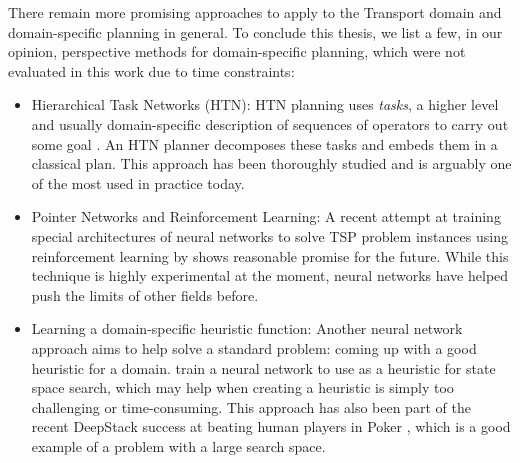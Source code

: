 There remain more promising approaches to apply to the Transport domain
and domain-specific planning in general.
To conclude this thesis, we list a few, in our opinion, perspective methods for domain-specific planning, which were not
evaluated in this work due to time constraints:
\begin{itemize}
\item Hierarchical Task Networks (HTN): 
HTN planning uses \textit{tasks},
a higher level and usually domain-specific description of sequences of operators
to carry out some goal
 \citep[Chapter~11]{Ghallab2004}. An HTN planner decomposes these tasks and embeds them in a classical plan. This approach has been thoroughly studied and is arguably one of the most used in practice today.

\item Pointer Networks and Reinforcement Learning: 
A recent attempt at training special architectures of neural networks to solve TSP problem instances using reinforcement learning by \citet{Bello2016} shows
reasonable promise for the future. While this technique is highly experimental at the moment,
neural networks have helped push the limits of other fields before.

\item Learning a domain-specific heuristic function: Another neural network
approach aims to help solve a standard problem: coming up with a good heuristic for a domain. \citet{Chen2011}
train a neural network to use as a heuristic for state space search,
which may help when creating a heuristic is simply too challenging or time-consuming.
This approach has also been part of the recent DeepStack success at
beating human players in Poker \citep{Moravcik2017}, which is a good example of a problem with a large search space.
\end{itemize}